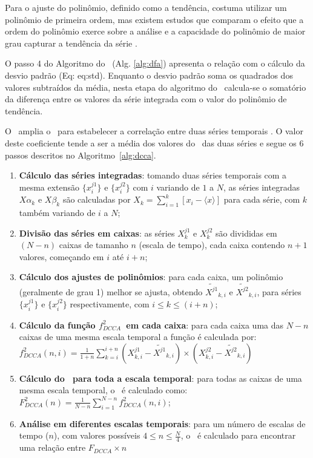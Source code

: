 Para o ajuste do polinômio, definido como a tendência, costuma utilizar um polinômio de primeira ordem, mas existem estudos que comparam o efeito que a ordem do polinômio exerce sobre a análise e a capacidade do polinômio de maior grau capturar a tendência da série \cite{huEffectTrendsDetrended2001}.

O passo 4 do Algoritmo do \dfa~(Alg. \ref{alg:dfa}) apresenta o relação com o cálculo da desvio padrão (Eq: eq:std). Enquanto o desvio padrão soma os quadrados dos valores subtraídos da média, nesta etapa do algoritmo do \dfa~calcula-se o somatório da diferença entre os valores da série integrada com o valor do polinômio de tendência.

O \dcca~amplia o \dfa~para estabelecer a correlação entre duas séries temporais \cite{Podobnik2008}. O valor deste coeficiente tende a ser a média dos valores do \dfa~das duas séries e segue os 6 passos descritos no Algoritmo~\ref{alg:dcca}.

\begin{algorithm} \caption{\dcca} \label{alg:dcca}
  \begin{enumerate}
    \item \textbf{Cálculo das séries integradas}: tomando duas séries temporais com a mesma extensão $\{x^{j1}_{i}\}$ e $\{x^{j2}_{i}\}$ com $i$ variando de $1$ a $N$,
          as séries integradas $X\alpha_{k}$ e $X\beta_{k}$ são calculadas por
          $X_{k} = \sum_{i=1}^{k}\left[x_{i} - \langle x \rangle \right] $ para cada série, com $k$ também variando de $i$ a $N$;
    \item \textbf{Divisão das séries em caixas}: as séries $X^{j1}_{k}$ e $X^{j2}_{k}$ são divididas em $(N - n)$ caixas de tamanho $n$ (escala de tempo), cada caixa contendo $n + 1$ valores, começando em $i$ até $i + n$;
    \item \textbf{Cálculo dos ajustes de polinômios}: para cada caixa, um polinômio (geralmente de grau 1) melhor se ajusta, obtendo
          $\widetilde{X^{j1}}_{k, i}$ e $\widetilde{X^{j2}}_{k, i}$,
          para séries $\{x^{j1}_{i}\}$ e $\{x^{j2}_{i}\}$ respectivamente,
          com $i \le k \le (i + n)$;
    \item \textbf{Cálculo da função $f_{DCCA}^{2}$~em cada caixa}: para cada caixa uma das $N - n$ caixas de uma mesma escala temporal a função é calculada por:\\[10pt]
     $f_{DCCA}^{2}(n, i) =
            \frac{1}{1+n} \sum_{k=i}^{i + n}(X^{j1}_{k,i}-\widetilde{X^{j1}}_{k, i}) \times (X^{j2}_{k,i}-\widetilde{X^{j2}}_{k, i})$
    \item \textbf{Cálculo do \dcca~para toda a escala temporal}: para todas as caixas de uma mesma escala temporal, o \dcca~é calculado como:\\[10pt]
          $F^2_{DCCA}(n) = \frac{1}{N - n} \sum_{i=1}^{N-n} f_{DCCA}^{2}(n, i)$;
    \item \textbf{Análise em diferentes escalas temporais}: para um número de escalas de tempo ($n$), com valores possíveis $4 \le n \le \frac{N}{4}$, o \dcca~é calculado para encontrar uma relação entre $F_{DCCA} \times n$

\end{enumerate}
\end{algorithm}

